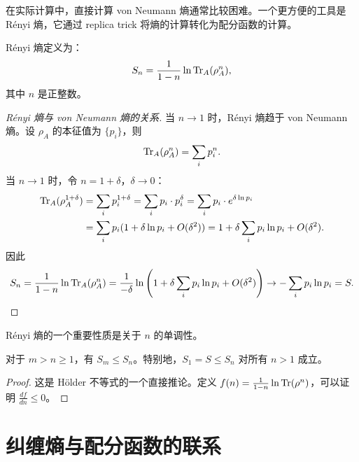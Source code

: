 在实际计算中，直接计算 von Neumann 熵通常比较困难。一个更方便的工具是 Rényi 熵，它通过 replica trick 将熵的计算转化为配分函数的计算。

\begin{definition}[Rényi 熵]\label{def:renyi}
Rényi 熵定义为：
\begin{equation}\label{eq:renyi}
    S_n = \frac{1}{1-n} \ln \Tr_A(\rho_A^n),
\end{equation}
其中 $n$ 是正整数。
\end{definition}

\begin{proof}[Rényi 熵与 von Neumann 熵的关系]
当 $n \to 1$ 时，Rényi 熵趋于 von Neumann 熵。设 $\rho_A$ 的本征值为 $\{p_i\}$，则
\begin{equation}
    \Tr_A(\rho_A^n) = \sum_i p_i^n.
\end{equation}
当 $n \to 1$ 时，令 $n = 1 + \delta$，$\delta \to 0$：
\begin{align}
    \Tr_A(\rho_A^{1+\delta}) &= \sum_i p_i^{1+\delta} = \sum_i p_i \cdot p_i^\delta = \sum_i p_i \cdot e^{\delta \ln p_i} \nonumber\\
    &= \sum_i p_i(1 + \delta \ln p_i + O(\delta^2)) = 1 + \delta \sum_i p_i \ln p_i + O(\delta^2).
\end{align}
因此
\begin{equation}
    S_n = \frac{1}{1-n}\ln\Tr_A(\rho_A^n) = \frac{1}{-\delta}\ln\left(1 + \delta\sum_i p_i \ln p_i + O(\delta^2)\right) \to -\sum_i p_i \ln p_i = S.
\end{equation}
\end{proof}

Rényi 熵的一个重要性质是关于 $n$ 的单调性。

\begin{property}
对于 $m > n \geq 1$，有 $S_m \leq S_n$。特别地，$S_1 = S \leq S_n$ 对所有 $n > 1$ 成立。
\end{property}

\begin{proof}
这是 Hölder 不等式的一个直接推论。定义 $f(n) = \frac{1}{1-n}\ln\Tr(\rho^n)$，可以证明 $\frac{df}{dn} \leq 0$。
\end{proof}

\section{纠缠熵与配分函数的联系}

